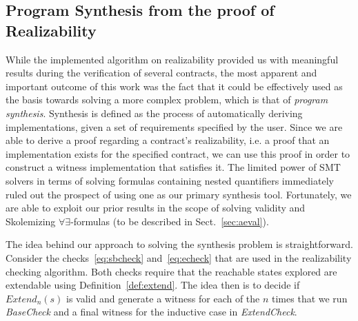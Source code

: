 \subsection{Program Synthesis from the proof of Realizability}

While the implemented algorithm on realizability provided us with meaningful
results during the verification of several contracts, the most apparent and
important outcome of this work was the fact that it could be effectively used as
the basis towards solving a more complex problem, which is that of
\textit{program synthesis}. Synthesis is defined as the process of automatically
deriving implementations, given a set of requirements specified by the user.
Since we are able to derive a proof regarding a contract's realizability,
i.e. a proof that an implementation exists for the specified
contract, we can use this proof in order to construct a witness
implementation that satisfies it. The limited power of SMT solvers
in terms of solving formulas containing nested quantifiers immediately ruled
out the prospect of using one as our primary synthesis tool. Fortunately, 
we are able to exploit our prior results in the scope of solving validity and 
Skolemizing $\forall\exists$-formulas (to be described in Sect.~\ref{sec:aeval}).

The idea behind our approach to solving the synthesis problem is
straightforward. Consider the checks~\ref{eq:sbcheck} and~\ref{eq:echeck} that
are used in the realizability checking algorithm. Both checks require
that the reachable states explored are extendable using
Definition~\ref{def:extend}.
The idea then is to decide if  $Extend_{n}(s)$ is valid and generate a witness 
for each of the $n$ times that we run \textit{BaseCheck} and a final witness 
for the inductive case in \textit{ExtendCheck}.


%
%

